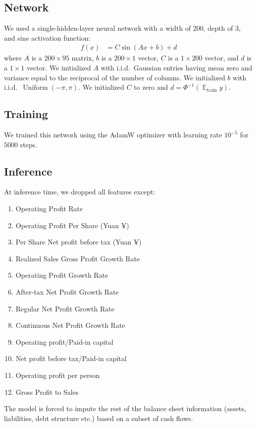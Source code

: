 \documentclass{article}
\DeclareMathOperator{\expect}{\mathbb{E}}
\begin{document}
\subsection{Network}
We used a single-hidden-layer neural network with a width of 200, depth of 3, and sine activation function:
\begin{align}
  f(x) &= C \sin(A x + b) + d
\end{align}
where \(A\) is a \(200 \times 95\) matrix, \(b\) is a \(200 \times 1\) vector, \(C\) is a \(1 \times 200\) vector, and \(d\) is a \(1 \times 1\) vector.
We initialized \(A\) with i.i.d.~Gaussian entries having mean zero and variance equal to the reciprocal of the number of columns.
We initialized \(b\) with i.i.d.~\(\operatorname{Uniform}(-\pi, \pi)\).
We initialized \(C\) to zero and \(d = \Phi^{-1}(\expect_\text{train} y)\).

\subsection{Training}
We trained this network using the AdamW optimizer \citep{loshchilov_decoupled_2019,deepmind_deepmind_2020} with learning rate \(10^{-5}\) for \(5000\) steps.

\subsection{Inference}
At inference time, we dropped all features except:
\begin{enumerate}
  \item Operating Profit Rate
  \item Operating Profit Per Share (Yuan ¥)
  \item Per Share Net profit before tax (Yuan ¥)
  \item Realized Sales Gross Profit Growth Rate
  \item Operating Profit Growth Rate
  \item After-tax Net Profit Growth Rate
  \item Regular Net Profit Growth Rate
  \item Continuous Net Profit Growth Rate
  \item Operating profit/Paid-in capital
  \item Net profit before tax/Paid-in capital
  \item Operating profit per person
  \item Gross Profit to Sales
\end{enumerate}
The model is forced to impute the rest of the balance sheet information (assets, liabilities, debt structure etc.) based on a subset of cash flows.
\end{document}
